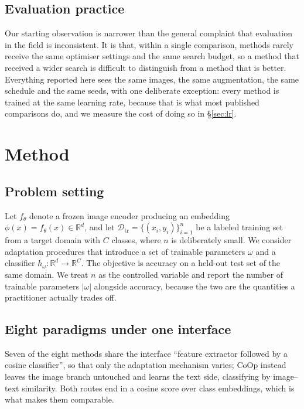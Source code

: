 \documentclass[preprint,12pt]{elsarticle}
\begin{document}
\subsection{Evaluation practice}

Our starting observation is narrower than the general complaint that evaluation
in the field is inconsistent. It is that, within a single comparison, methods
rarely receive the same optimiser settings and the same search budget, so a
method that received a wider search is difficult to distinguish from a method
that is better. Everything reported here sees the same images, the same
augmentation, the same schedule and the same seeds, with one deliberate
exception: every method is trained at the same learning rate, because that is
what most published comparisons do, and we measure the cost of doing so in
\S\ref{sec:lr}.

\section{Method}
\label{sec:method}

\subsection{Problem setting}

Let $f_\theta$ denote a frozen image encoder producing an embedding
$\phi(x) = f_\theta(x) \in \mathbb{R}^{d}$, and let
$\mathcal{D}_{\text{tr}} = \{(x_i, y_i)\}_{i=1}^{n}$ be a labeled training set
from a target domain with $C$ classes, where $n$ is deliberately small. We
consider adaptation procedures that introduce a set of trainable parameters
$\omega$ and a classifier $h_{\omega}: \mathbb{R}^d \to \mathbb{R}^C$. The
objective is accuracy on a held-out test set of the same domain. We treat $n$ as
the controlled variable and report the number of trainable parameters
$|\omega|$ alongside accuracy, because the two are the quantities a practitioner
actually trades off.

\subsection{Eight paradigms under one interface}

Seven of the eight methods share the interface ``feature extractor followed by a
cosine classifier'', so that only the adaptation mechanism varies; CoOp instead
leaves the image branch untouched and learns the text side, classifying by
image--text similarity. Both routes end in a cosine score over class embeddings,
which is what makes them comparable.
\end{document}

